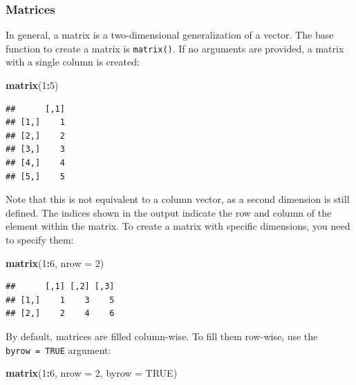 \documentclass[
]{article}
\newenvironment{Shaded}{\begin{snugshade}}{\end{snugshade}}
\newcommand{\AttributeTok}[1]{\textcolor[rgb]{0.13,0.29,0.53}{#1}}
\newcommand{\ConstantTok}[1]{\textcolor[rgb]{0.56,0.35,0.01}{#1}}
\newcommand{\DecValTok}[1]{\textcolor[rgb]{0.00,0.00,0.81}{#1}}
\newcommand{\FunctionTok}[1]{\textcolor[rgb]{0.13,0.29,0.53}{\textbf{#1}}}
\newcommand{\NormalTok}[1]{#1}
\newcommand{\SpecialCharTok}[1]{\textcolor[rgb]{0.81,0.36,0.00}{\textbf{#1}}}
\begin{document}
\hypertarget{matrices}{%
\subsubsection{Matrices}\label{matrices}}

In general, a matrix is a two-dimensional generalization of a vector.
The base function to create a matrix is \texttt{matrix()}. If no
arguments are provided, a matrix with a single column is created:

\begin{Shaded}
\begin{Highlighting}[]
\FunctionTok{matrix}\NormalTok{(}\DecValTok{1}\SpecialCharTok{:}\DecValTok{5}\NormalTok{)}
\end{Highlighting}
\end{Shaded}

\begin{verbatim}
##      [,1]
## [1,]    1
## [2,]    2
## [3,]    3
## [4,]    4
## [5,]    5
\end{verbatim}

Note that this is not equivalent to a column vector, as a second
dimension is still defined. The indices shown in the output indicate the
row and column of the element within the matrix. To create a matrix with
specific dimensions, you need to specify them:

\begin{Shaded}
\begin{Highlighting}[]
\FunctionTok{matrix}\NormalTok{(}\DecValTok{1}\SpecialCharTok{:}\DecValTok{6}\NormalTok{, }\AttributeTok{nrow =} \DecValTok{2}\NormalTok{)}
\end{Highlighting}
\end{Shaded}

\begin{verbatim}
##      [,1] [,2] [,3]
## [1,]    1    3    5
## [2,]    2    4    6
\end{verbatim}

By default, matrices are filled column-wise. To fill them row-wise, use
the \texttt{byrow\ =\ TRUE} argument:

\begin{Shaded}
\begin{Highlighting}[]
\FunctionTok{matrix}\NormalTok{(}\DecValTok{1}\SpecialCharTok{:}\DecValTok{6}\NormalTok{, }\AttributeTok{nrow =} \DecValTok{2}\NormalTok{, }\AttributeTok{byrow =} \ConstantTok{TRUE}\NormalTok{)}
\end{Highlighting}
\end{Shaded}
\end{document}
